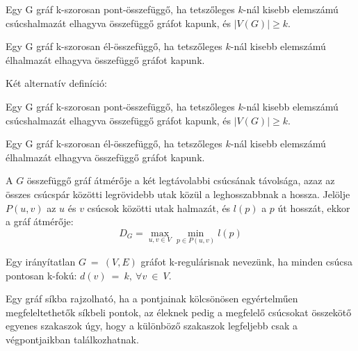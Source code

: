   \begin{definition} 
    Egy G gráf k-szorosan pont-összefüggő, ha tetszőleges $k$-nál kisebb elemszámú csúcshalmazát elhagyva összefüggő gráfot kapunk, és $|V(G)| \geq k$.
  \end{definition}
  \begin{definition} 
    Egy G gráf k-szorosan él-összefüggő, ha tetszőleges $k$-nál kisebb elemszámú élhalmazát elhagyva összefüggő gráfot kapunk.
  \end{definition}

  Két alternatív definíció:
  \begin{definition} 
    Egy G gráf k-szorosan pont-összefüggő, ha tetszőleges $k$-nál kisebb elemszámú csúcshalmazát elhagyva összefüggő gráfot kapunk, és $|V(G)| \geq k$.
  \end{definition}

  \begin{definition} 
    Egy G gráf k-szorosan él-összefüggő, ha tetszőleges $k$-nál kisebb elemszámú élhalmazát elhagyva összefüggő gráfot kapunk.
  \end{definition}

  \begin{definition} 
    A $G$ összefüggő gráf átmérője a két legtávolabbi csúcsának távolsága, azaz az összes csúcspár közötti legrövidebb utak közül a leghosszabbnak a hossza. Jelölje $P(u, v)$ az $u$ és $v$ csúcsok közötti utak halmazát, és $l(p)$ a $p$ út hosszát, ekkor a gráf átmérője:\\
    $$D_G = \max_{u,v \in V} \min_{p \in P(u,v)} l(p)$$
  \end{definition}

  \begin{definition} 
    Egy irányítatlan $G~=~(V,E)$ gráfot k-regulárisnak nevezünk, ha minden csúcsa pontosan k-fokú:
    $d(v)~=~k,~\forall v~\in~V.$
  \end{definition}

  \begin{definition} 
    Egy gráf síkba rajzolható, ha a pontjainak kölcsönösen egyértelműen megfeleltethetők síkbeli pontok, az éleknek pedig a megfelelő csúcsokat összekötő egyenes szakaszok úgy, hogy a különböző szakaszok legfeljebb csak a végpontjaikban találkozhatnak.
  \end{definition}

